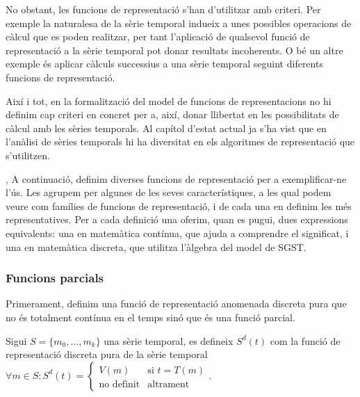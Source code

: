 No obstant, les funcions de representació s'han d'utilitzar amb
criteri. Per exemple la naturalesa de la sèrie temporal indueix a unes
possibles operacions de càlcul que es poden realitzar, per tant
l'aplicació de qualsevol funció de representació a la sèrie temporal
pot donar resultats incoherents. O bé un altre exemple és aplicar
càlculs successius a una sèrie temporal seguint diferents funcions de
representació.  

Així i tot, en la formalització del model de funcions de
representacions no hi definim cap criteri en concret per a, així,
donar llibertat en les possibilitats de càlcul amb les sèries
temporals. Al capítol  d'estat actual ja s'ha vist que en
l'anàlisi de sèries temporals hi ha diversitat en els algoritmes de
representació que s'utilitzen.

,
A continuació, definim diverses funcions de representació per a
exemplificar-ne l'ús. Les agrupem per algunes de les seves
característiques, a les qual podem veure com famílies de funcions de
representació, i de cada una en definim les més representatives. Per a
cada definició una oferim, quan es pugui, dues expressions
equivalents: una en matemàtica contínua, que ajuda a comprendre el
significat, i una en matemàtica discreta, que utilitza l'àlgebra del
model de SGST.



\subsubsection{Funcions parcials}

Primerament, definim una funció de representació anomenada discreta
pura que no és totalment contínua en el temps sinó que és una funció
parcial.
\begin{definition}
  Sigui $S=\{m_0,\ldots,m_k\}$ una sèrie temporal, es defineix
  $S^d(t)$ com la funció de representació discreta pura de la sèrie
  temporal $\forall m \in S: S^d(t) =
  \begin{cases}
    V(m) & \text{si }  t=T(m) \\
    \text{no definit} & \text{altrament}
  \end{cases}$.
\end{definition}

